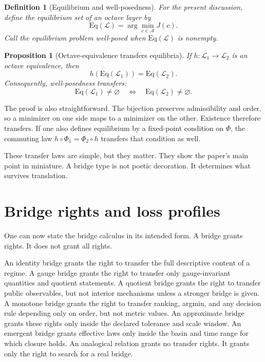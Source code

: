 \documentclass[11pt]{article}
\newtheorem{definition}{Definition}
\newtheorem{proposition}{Proposition}
\begin{document}
\begin{definition}[Equilibrium and well-posedness]
For the present discussion, define the equilibrium set of an octave layer by
\[
\mathrm{Eq}(\mathcal{L})=\arg\min_{c\in\mathcal{A}} J(c).
\]
Call the equilibrium problem well-posed when $\mathrm{Eq}(\mathcal{L})$ is nonempty.
\end{definition}

\begin{proposition}[Octave-equivalence transfers equilibria]
If $h:\mathcal{L}_1\to\mathcal{L}_2$ is an octave equivalence, then
\[
h(\mathrm{Eq}(\mathcal{L}_1))=\mathrm{Eq}(\mathcal{L}_2).
\]
Consequently, well-posedness transfers:
\[
\mathrm{Eq}(\mathcal{L}_1)\neq \varnothing
\quad\Longleftrightarrow\quad
\mathrm{Eq}(\mathcal{L}_2)\neq \varnothing.
\]
\end{proposition}

\noindent
The proof is also straightforward. The bijection preserves admissibility and order, so a minimizer on one side maps to a minimizer on the other. Existence therefore transfers. If one also defines equilibrium by a fixed-point condition on $\Phi$, the commuting law $h\circ\Phi_1=\Phi_2\circ h$ transfers that condition as well.

These transfer laws are simple, but they matter. They show the paper's main point in miniature. A bridge type is not poetic decoration. It determines what survives translation.

\section{Bridge rights and loss profiles}

One can now state the bridge calculus in its intended form. A bridge grants rights. It does not grant all rights.

An identity bridge grants the right to transfer the full descriptive content of a regime. A gauge bridge grants the right to transfer only gauge-invariant quantities and quotient statements. A quotient bridge grants the right to transfer public observables, but not interior mechanisms unless a stronger bridge is given. A monotone bridge grants the right to transfer ranking, argmin, and any decision rule depending only on order, but not metric values. An approximate bridge grants these rights only inside the declared tolerance and scale window. An emergent bridge grants effective laws only inside the basin and time range for which closure holds. An analogical relation grants no transfer rights. It grants only the right to search for a real bridge.
\end{document}
